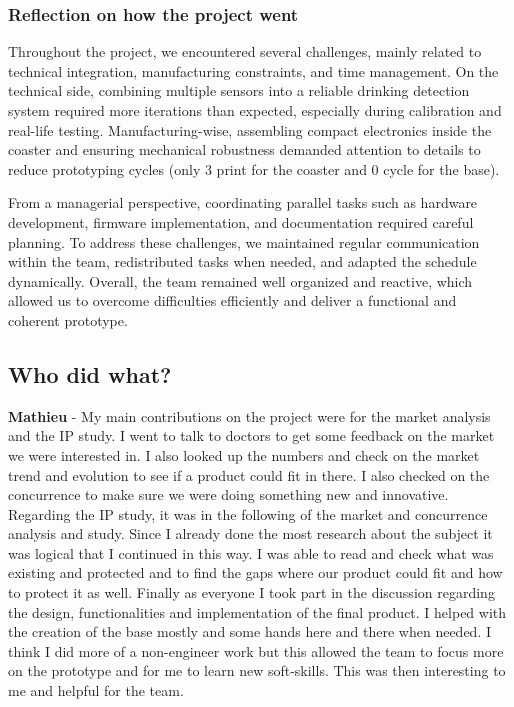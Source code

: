 \documentclass{article}
\begin{document}
\subsubsection{Reflection on how the project went}

Throughout the project, we encountered several challenges, mainly related to technical integration, manufacturing constraints, and time management. On the technical side, combining multiple sensors into a reliable drinking detection system required more iterations than expected, especially during calibration and real-life testing. Manufacturing-wise, assembling compact electronics inside the coaster and ensuring mechanical robustness demanded attention to details to reduce prototyping cycles (only 3 print for the coaster and 0 cycle for the base).\vspace{0.2cm}

From a managerial perspective, coordinating parallel tasks such as hardware development, firmware implementation, and documentation required careful planning. To address these challenges, we maintained regular communication within the team, redistributed tasks when needed, and adapted the schedule dynamically. Overall, the team remained well organized and reactive, which allowed us to overcome difficulties efficiently and deliver a functional and coherent prototype.

\subsection{Who did what?}
\textbf{Mathieu} - My main contributions on the project were for the market analysis and the IP study. I went to talk to doctors to get some feedback on the market we were interested in. I also looked up the numbers and check on the market trend and evolution to see if a product could fit in there. I also checked on the concurrence to make sure we were doing something new and innovative. Regarding the IP study, it was in the following of the market and concurrence analysis and study. Since I already done the most research about the subject it was logical that I continued in this way.  I was able to read and check what was existing and protected and to find the gaps where our product could fit and how to protect it as well. Finally as everyone I took part in the discussion regarding the design, functionalities and implementation of the final product. I helped with the creation of the base mostly and some hands here and there when needed. I think I did more of a non-engineer work but this allowed the team to focus more on the prototype and for me to learn new soft-skills. This was then interesting to me and helpful for the team.\vspace{0.2cm}
\end{document}
